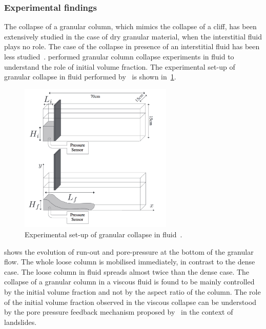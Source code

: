 \subsubsection{Experimental findings}

The collapse of a granular column, which mimics the collapse of a cliff, has 
been extensively studied in the case of dry granular material, when the 
interstitial fluid plays no role. The case of the collapse in presence of an 
interstitial fluid has been less studied~\citep{Topin2012}. 
\citet{Rondon2011} performed granular column collapse experiments in fluid to 
understand the role of initial volume fraction. The experimental set-up 
of granular collapse in fluid performed by~\citet{Rondon2011} is shown 
in~\cref{fig:Fluid_Collapse}.

\begin{figure}[htbp]
\centering
\includegraphics[width=0.65\textwidth]{Fluid_Collapse}
\caption{Experimental set-up of granular collapse in fluid~\citep{Rondon2011}.}
\label{fig:Fluid_Collapse}
\end{figure}

 shows the evolution of run-out 
and pore-pressure at the bottom of the granular flow. The whole loose column is 
mobilised immediately, in contrast to the dense case. The loose column in fluid 
spreads almost twice than the dense case. The collapse of a granular column in 
a viscous fluid is found to be mainly controlled by the initial volume fraction 
and not by the aspect ratio of the column. The role of the initial volume 
fraction observed in the viscous collapse can be understood by the pore 
pressure feedback mechanism proposed by~\citep{Schaeffer2008,Iverson2000} in 
the context of landslides. 

